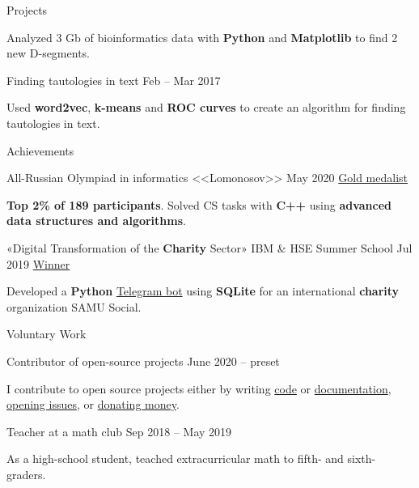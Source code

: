 \documentclass{resume}
\begin{document}
\begin{rSection}{Projects}
\begin{rSubsection}
    \item Analyzed 3 Gb of bioinformatics data with \textbf{Python} and \textbf{Matplotlib} to find 2 new D-segments.
    \end{rSubsection}

    \begin{rSubsection}
        {Finding tautologies in text}
            {Feb -- Mar 2017}{}{}

    \item Used \textbf{word2vec}, \textbf{k-means} and \textbf{ROC curves} to create an algorithm for finding tautologies in text.
    \end{rSubsection}
\end{rSection}

\begin{rSection}{Achievements}
    \begin{rSubsection}
        {All-Russian Olympiad in informatics <<Lomonosov>>}
            {May 2020}
        {\href{https://github.com/SenchoPens/cv/blob/master/lomonosov-diploma-translated.pdf}{Gold medalist}}{}

    \item \textbf{Top 2\% of 189 participants}. Solved CS tasks with \textbf{C++} using \textbf{advanced data structures and algorithms}.
    \end{rSubsection}

    \begin{rSubsection}
        {«Digital Transformation of the \textbf{Charity} Sector» IBM \& HSE Summer School}
            {Jul 2019}
        {\href{https://www.hse.ru/en/news/298686356.html}{Winner}}{}

    \item Developed a \textbf{Python} \href{https://github.com/SenchoPens/samumoskva_bot}{Telegram bot}
      using \textbf{SQLite} for an international \textbf{charity} organization SAMU Social.
    \end{rSubsection}
\end{rSection}

\begin{rSection}{Voluntary Work}
    \begin{rSubsection}
        {Contributor of open-source projects}
            {June 2020 -- preset}{}{}

    \item I contribute to open source projects either by writing
      \href{https://github.com/darkkeks/kks/pull/125/files}{code} or
      \href{https://github.com/hyperledger/fabric-docs-i18n/pull/80}{documentation},
      \href{https://github.com/search?q=is\%3Aopen+is\%3Aissue+author\%3ASenchoPens+archived\%3Afalse&type=}{opening issues},
      or \href{https://opencollective.com/guest-d7d943a1}{donating money}.
    \end{rSubsection}

    \begin{rSubsection}
        {Teacher at a math club}
            {Sep 2018 -- May 2019}{}{}

    \item As a high-school student, teached extracurricular math to fifth- and sixth-graders.
    \end{rSubsection}
\end{rSection}
\end{document}
